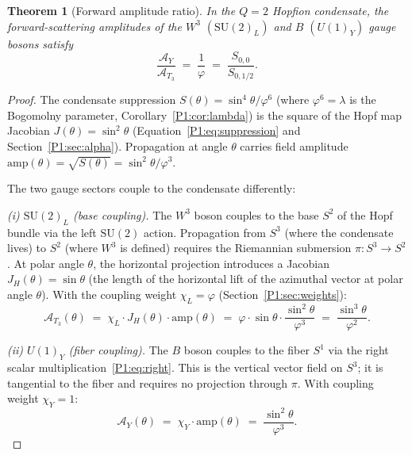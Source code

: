 \documentclass[11pt,a4paper]{article}
\newtheorem{theorem}{Theorem}[section]
\theoremstyle{definition}
\theoremstyle{remark}
\newcommand{\vp}{\varphi}
\newcommand{\lam}{\lambda}
\begin{document}
\begin{theorem}[Forward amplitude ratio]
\label{P1:thm:amplitude_ratio}
In the $Q=2$ Hopfion condensate, the forward-scattering amplitudes
of the $W^3$ $(\mathrm{SU}(2)_L)$ and $B$ $(U(1)_Y)$ gauge bosons
satisfy
\begin{equation}
  \frac{\mathcal{A}_{Y}}{\mathcal{A}_{T_3}}
  \;=\; \frac{1}{\vp}
  \;=\; \frac{S_{0,0}}{S_{0,1/2}}.
  \label{P1:eq:amp_ratio}
\end{equation}
\end{theorem}

\begin{proof}
The condensate suppression $S(\theta)=\sin^4\!\theta/\vp^6$ (where $\vp^6=\lam$
is the Bogomolny parameter, Corollary~\ref{P1:cor:lambda}) is the
square of the Hopf map Jacobian $J(\theta)=\sin^2\!\theta$
(Equation~\eqref{P1:eq:suppression} and
Section~\ref{P1:sec:alpha}).  Propagation at angle $\theta$ carries
field amplitude $\mathrm{amp}(\theta)=\sqrt{S(\theta)}=\sin^2\!\theta/\vp^3$.

The two gauge sectors couple to the condensate differently:

\emph{(i) $\mathrm{SU}(2)_L$ (base coupling).}
The $W^3$ boson couples to the base $S^2$ of the Hopf bundle via the
left $\mathrm{SU}(2)$ action.  Propagation from $S^3$ (where the
condensate lives) to $S^2$ (where $W^3$ is defined) requires the
Riemannian submersion $\pi:S^3\to S^2$.  At polar angle $\theta$,
the horizontal projection introduces a Jacobian
$J_H(\theta)=\sin\theta$ (the length of the horizontal lift of the
azimuthal vector at polar angle $\theta$).
With the coupling weight $\chi_L=\vp$ (Section~\ref{P1:sec:weights}):
\begin{equation}
  \mathcal{A}_{T_3}(\theta)
  \;=\; \chi_L \cdot J_H(\theta) \cdot \mathrm{amp}(\theta)
  \;=\; \vp \cdot \sin\theta \cdot \frac{\sin^2\!\theta}{\vp^3}
  \;=\; \frac{\sin^3\!\theta}{\vp^2}.
  \label{P1:eq:AT3_theta}
\end{equation}

\emph{(ii) $U(1)_Y$ (fiber coupling).}
The $B$ boson couples to the fiber $S^1$ via the right scalar
multiplication~\eqref{P1:eq:right}.  This is the vertical vector field
on $S^3$; it is tangential to the fiber and requires no projection
through $\pi$.  With coupling weight $\chi_Y=1$:
\begin{equation}
  \mathcal{A}_{Y}(\theta)
  \;=\; \chi_Y \cdot \mathrm{amp}(\theta)
  \;=\; \frac{\sin^2\!\theta}{\vp^3}.
  \label{P1:eq:AY_theta}
\end{equation}


\end{proof}
\end{document}
